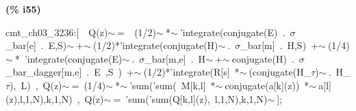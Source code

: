 \documentclass[fleqn]{article}
\begin{document}
\noindent
\begin{minipage}[t]{4.000000em}\color{red}\bfseries
(\% i55)	
\end{minipage}
\begin{minipage}[t]{\textwidth}\color{blue}
cmt\_ch03\_3236:[\ \ Q(z)\ensuremath{\sim\ }=\ \ (1/2)\ensuremath{\sim\ }*\ensuremath{\sim\ }'integrate(conjugate(E)\ .\ \ensuremath{\sigma}\_bar[e]\ .\ E,S)\ensuremath{\sim\ }+\ensuremath{\sim\ }(1/2)*'integrate(conjugate(H)\ensuremath{\sim\ }.\ \ensuremath{\sigma}\_bar[m]\ .\ H,S)\ +\ensuremath{\sim\ }(1/4)\ensuremath{\sim\ }*\ 'integrate(conjugate(E)\ensuremath{\sim\ }.\ \ensuremath{\sigma}\_bar[m,e]\ .\ H\ensuremath{\sim\ }+\ensuremath{\sim\ }conjugate(H)\ .\ \ensuremath{\sigma}\_bar\_dagger[m,e]\ .\ E\ ,S\ )\ +\ensuremath{\sim\ }(1/2)*'integrate(R[s]\ *\ensuremath{\sim\ }(conjugate(H\_\ensuremath{\tau})\ensuremath{\sim\ }.\ H\_\ensuremath{\tau}),\ L)\ ,\ Q(z)\ensuremath{\sim\ }=\ (1/4)\ensuremath{\sim\ }*\ensuremath{\sim\ }'sum('sum(\ M[k,l]\ *\ensuremath{\sim\ }conjugate(a[k](z))\ *\ensuremath{\sim\ }a[l](z),l,1,N),k,1,N)\ ,\ Q(z)\ensuremath{\sim\ }=\ 'sum('sum(Q[k,l](z),\ l,1,N),k,1,N)\ensuremath{\sim\ }];
\end{minipage}
\end{document}
